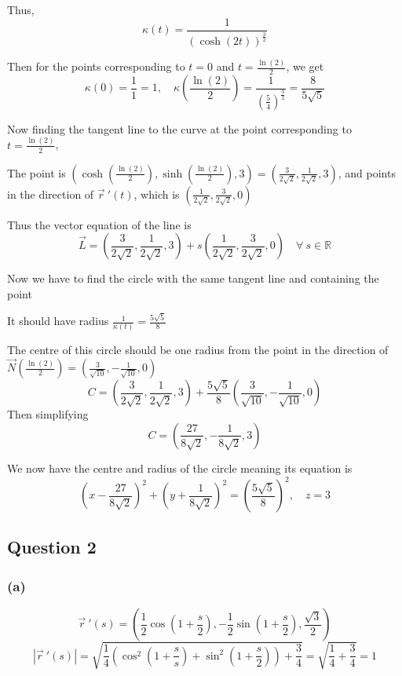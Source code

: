 \documentclass{article}
\begin{document}
Thus,
\[
\kappa(t) = \frac{1}{(\cosh(2t))^{\frac{3}{2}}}
\]

Then for the points corresponding to \(t = 0\) and \(t = \frac{\ln(2)}{2}\), we get
\[
\kappa(0) = \frac{1}{1} = 1, \quad \kappa\left(\frac{\ln(2)}{2}\right) = \frac{1}{(\frac{5}{4})^{\frac{3}{2}}} = \frac{8}{5\sqrt{5}}
\]

Now finding the tangent line to the curve at the point corresponding to \(t = \frac{\ln(2)}{2}\),

The point is \((\cosh(\frac{\ln(2)}{2}), \sinh(\frac{\ln(2)}{2}), 3) = (\frac{3}{2\sqrt{2}}, \frac{1}{2\sqrt{2}}, 3)\), and points
in the direction of \(\vec{r} \ '(t)\), which is \((\frac{1}{2\sqrt{2}}, \frac{3}{2\sqrt{2}}, 0)\)

Thus the vector equation of the line is 
\[
\vec{L} = \left(\frac{3}{2\sqrt{2}}, \frac{1}{2\sqrt{2}}, 3\right) + s\left(\frac{1}{2\sqrt{2}}, \frac{3}{2\sqrt{2}}, 0\right) \quad \forall \ s \in \mathbb{R}
\]

Now we have to find the circle with the same tangent line and containing the point

It should have radius \(\frac{1}{\kappa(t)} = \frac{5\sqrt{5}}{8}\)

The centre of this circle should be one radius from the point in the direction of \(\vec{N}(\frac{\ln(2)}{2}) = (\frac{3}{\sqrt{10}}, -\frac{1}{\sqrt{10}}, 0)\) 
\[
C = \left(\frac{3}{2\sqrt{2}}, \frac{1}{2\sqrt{2}}, 3\right) + \frac{5\sqrt{5}}{8} \left(\frac{3}{\sqrt{10}}, -\frac{1}{\sqrt{10}}, 0\right)
\]
Then simplifying
\[
C = \left(\frac{27}{8\sqrt{2}}, -\frac{1}{8\sqrt{2}}, 3\right)
\]

We now have the centre and radius of the circle meaning its equation is
\[
\left( x- \frac{27}{8\sqrt{2}}\right)^2 + \left(y + \frac{1}{8\sqrt{2}}\right)^2 = \left(\frac{5\sqrt{5}}{8}\right)^2, \quad z=3
\]


\subsection*{Question 2}

\subsubsection*{(a)}
\[
\vec{r} \ '(s) = \left(\frac{1}{2}\cos\left(1+ \frac{s}{2}\right), -\frac{1}{2}\sin\left(1+ \frac{s}{2}\right), \frac{\sqrt{3}}{2}\right)
\]
\[
|\vec{r} \ '(s)| = \sqrt{\frac{1}{4}(\cos^2\left(1+\frac{s}{s}\right) + \sin^2\left(1+ \frac{s}{2}\right)) + \frac{3}{4}} = \sqrt{\frac{1}{4} + \frac{3}{4}} = 1
\]
\end{document}
